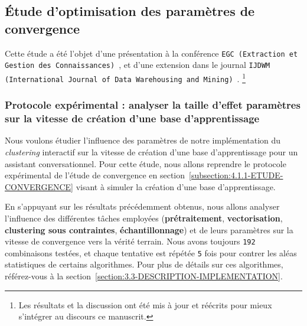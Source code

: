 	\subsection{Étude d'optimisation des paramètres de convergence}
	\label{subsection:4.2.1-ETUDE-OPTIMISATION}
			
		Cette étude a été l'objet d'une présentation à la conférence \texttt{EGC (Extraction et Gestion des Connaissances)}~\citep{schild:conception-interactive-clustering:2021}, et d'une extension dans le journal \texttt{IJDWM (International Journal of Data Warehousing and Mining)}~\citep{schild:extension-interactive-clustering:2022}.
		\footnote{Les résultats et la discussion ont été mis à jour et réécrits pour mieux s'intégrer au discours ce manuscrit.}

		\subsubsection{Protocole expérimental : analyser la taille d'effet paramètres sur la vitesse de création d'une base d'apprentissage}

			Nous voulons étudier l'influence des paramètres de notre implémentation du \textit{clustering} interactif sur la vitesse de création d'une base d'apprentissage pour un assistant conversationnel.
			Pour cette étude, nous allons reprendre le protocole expérimental de l'étude de convergence en section~\ref{subsection:4.1.1-ETUDE-CONVERGENCE} visant à simuler la création d'une base d'apprentissage.
			
			En s'appuyant sur les résultats précédemment obtenus, nous allons analyser l'influence des différentes tâches employées (\textbf{prétraitement}, \textbf{vectorisation}, \textbf{clustering sous contraintes}, \textbf{échantillonnage}) et de leurs paramètres sur la vitesse de convergence vers la vérité terrain.
			Nous avons toujours \texttt{192} combinaisons testées, et chaque tentative est répétée \texttt{5} fois pour contrer les aléas statistiques de certains algorithmes.
			Pour plus de détails sur ces algorithmes, référez-vous à la section~\ref{section:3.3-DESCRIPTION-IMPLEMENTATION}.
			
